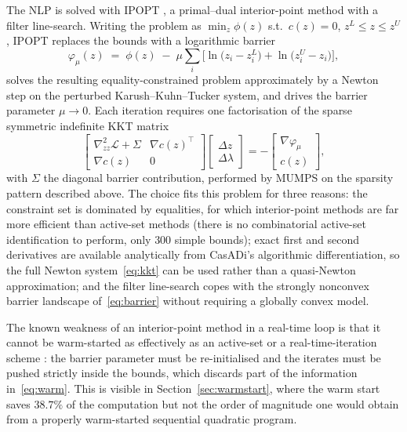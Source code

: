 \documentclass[11pt,a4paper]{article}
\begin{document}
The NLP is solved with IPOPT \cite{wachter2006ipopt}, a primal--dual interior-point method with a filter
line-search. Writing the problem as $\min_z \phi(z)$ s.t.\ $c(z)=0$, $z^L\le z\le z^U$, IPOPT replaces the
bounds with a logarithmic barrier
\begin{equation}
  \varphi_\mu(z) \;=\; \phi(z) \;-\; \mu\sum_i\Big[\ln\!\big(z_i-z_i^L\big)+\ln\!\big(z_i^U-z_i\big)\Big],
  \label{eq:ipopt}
\end{equation}
solves the resulting equality-constrained problem approximately by a Newton step on the perturbed
Karush--Kuhn--Tucker system, and drives the barrier parameter $\mu\to0$. Each iteration requires one
factorisation of the sparse symmetric indefinite KKT matrix
\begin{equation}
  \begin{bmatrix}
    \nabla^2_{zz}\mathcal{L} + \Sigma & \nabla c(z)^{\!\top}\\
    \nabla c(z) & 0
  \end{bmatrix}
  \begin{bmatrix}\Delta z\\ \Delta\lambda\end{bmatrix}
  = -\begin{bmatrix}\nabla\varphi_\mu\\ c(z)\end{bmatrix},
  \label{eq:kkt}
\end{equation}
with $\Sigma$ the diagonal barrier contribution, performed by MUMPS on the sparsity pattern described above.
The choice fits this problem for three reasons: the constraint set is dominated by equalities, for which
interior-point methods are far more efficient than active-set methods (there is no combinatorial active-set
identification to perform, only $300$ simple bounds); exact first and second derivatives are available
analytically from CasADi's algorithmic differentiation, so the full Newton system~\eqref{eq:kkt} can be used
rather than a quasi-Newton approximation; and the filter line-search copes with the strongly nonconvex
barrier landscape of~\eqref{eq:barrier} without requiring a globally convex model.

The known weakness of an interior-point method in a real-time loop is that it cannot be warm-started as
effectively as an active-set or a real-time-iteration scheme \cite{diehl2005realtime}: the barrier
parameter must be re-initialised and the iterates must be pushed strictly inside the bounds, which discards
part of the information in~\eqref{eq:warm}. This is visible in Section~\ref{sec:warmstart}, where the warm
start saves $38.7\%$ of the computation but not the order of magnitude one would obtain from a properly
warm-started sequential quadratic program.
\end{document}
